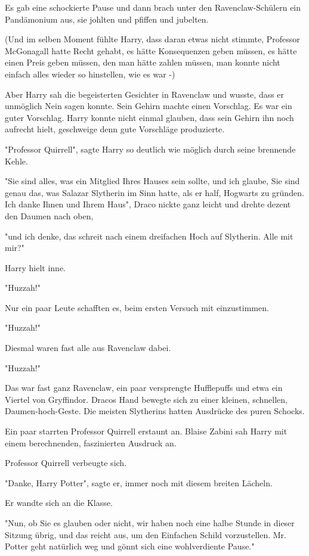 {Es gab eine schockierte Pause und dann brach unter den Ravenclaw-Schülern ein Pandämonium aus, sie johlten und pfiffen und jubelten.

(Und im selben Moment fühlte Harry, dass daran etwas nicht stimmte, Professor McGonagall hatte Recht gehabt, es hätte Konsequenzen geben müssen, es hätte einen Preis geben müssen, den man hätte zahlen müssen, man konnte nicht einfach alles wieder so hinstellen, wie es war -)

Aber Harry sah die begeisterten Gesichter in Ravenclaw und wusste, dass er unmöglich Nein sagen konnte. Sein Gehirn machte einen Vorschlag. Es war ein guter Vorschlag. Harry konnte nicht einmal glauben, dass sein Gehirn ihn noch aufrecht hielt, geschweige denn gute Vorschläge produzierte.

"Professor Quirrell", sagte Harry so deutlich wie möglich durch seine brennende Kehle.

"Sie sind alles, was ein Mitglied Ihres Hauses sein sollte, und ich glaube, Sie sind genau das, was Salazar Slytherin im Sinn hatte, als er half, Hogwarts zu gründen. Ich danke Ihnen und Ihrem Haus", Draco nickte ganz leicht und drehte dezent den Daumen nach oben,

"und ich denke, das schreit nach einem dreifachen Hoch auf Slytherin. Alle mit mir?"

Harry hielt inne.

"Huzzah!"

Nur ein paar Leute schafften es, beim ersten Versuch mit einzustimmen.

"Huzzah!"

Diesmal waren fast alle aus Ravenclaw dabei.

"Huzzah!"

Das war fast ganz Ravenclaw, ein paar versprengte Hufflepuffs und etwa ein Viertel von Gryffindor. Dracos Hand bewegte sich zu einer kleinen, schnellen, Daumen-hoch-Geste. Die meisten Slytherins hatten Ausdrücke des puren Schocks.

Ein paar starrten Professor Quirrell erstaunt an. Blaise Zabini sah Harry mit einem berechnenden, faszinierten Ausdruck an.

Professor Quirrell verbeugte sich.

"Danke, Harry Potter", sagte er, immer noch mit diesem breiten Lächeln.

Er wandte sich an die Klasse.

"Nun, ob Sie es glauben oder nicht, wir haben noch eine halbe Stunde in dieser Sitzung übrig, und das reicht aus, um den Einfachen Schild vorzustellen. Mr. Potter geht natürlich weg und gönnt sich eine wohlverdiente Pause."

}
